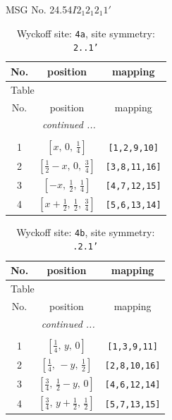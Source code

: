 \documentclass[fleqn,8pt]{jsarticle}
\begin{document}
\setcounter{MaxMatrixCols}{32}

\renewcommand{\tablename}{Table~}
\renewcommand{\figurename}{Figure~}
\begin{center}
\LARGE
MSG No. 24.54\quad$I2_{1}2_{1}2_{1}1'$
\end{center}
\renewcommand{\arraystretch}{1.2}
\begin{longtable}{ccc}
\caption{Wyckoff site: {\tt 4a}, site symmetry: {\tt 2..1'}}
 \\
 \hline \hline
No. & position & mapping \\ \hline \endfirsthead

\multicolumn{2}{l}{\tablename\ \thetable{}} \\
 \hline \hline
No. & position & mapping \\ \hline \endhead

 \hline \hline
\multicolumn{2}{r}{\footnotesize\it continued ...} \\ \endfoot

 \hline \hline
\multicolumn{2}{r}{} \\ \endlastfoot

1 & $\left[ x,\, 0,\, \frac{1}{4} \right]$ & {\tt [1,2,9,10]} \\ \hline
2 & $\left[ \frac{1}{2} - x,\, 0,\, \frac{3}{4} \right]$ & {\tt [3,8,11,16]} \\ \hline
3 & $\left[ - x,\, \frac{1}{2},\, \frac{1}{4} \right]$ & {\tt [4,7,12,15]} \\ \hline
4 & $\left[ x + \frac{1}{2},\, \frac{1}{2},\, \frac{3}{4} \right]$ & {\tt [5,6,13,14]} \\
\end{longtable}
\renewcommand{\arraystretch}{1.2}
\begin{longtable}{ccc}
\caption{Wyckoff site: {\tt 4b}, site symmetry: {\tt .2.1'}}
 \\
 \hline \hline
No. & position & mapping \\ \hline \endfirsthead

\multicolumn{2}{l}{\tablename\ \thetable{}} \\
 \hline \hline
No. & position & mapping \\ \hline \endhead

 \hline \hline
\multicolumn{2}{r}{\footnotesize\it continued ...} \\ \endfoot

 \hline \hline
\multicolumn{2}{r}{} \\ \endlastfoot

1 & $\left[ \frac{1}{4},\, y,\, 0 \right]$ & {\tt [1,3,9,11]} \\ \hline
2 & $\left[ \frac{1}{4},\, - y,\, \frac{1}{2} \right]$ & {\tt [2,8,10,16]} \\ \hline
3 & $\left[ \frac{3}{4},\, \frac{1}{2} - y,\, 0 \right]$ & {\tt [4,6,12,14]} \\ \hline
4 & $\left[ \frac{3}{4},\, y + \frac{1}{2},\, \frac{1}{2} \right]$ & {\tt [5,7,13,15]} \\
\end{longtable}
\end{document}
